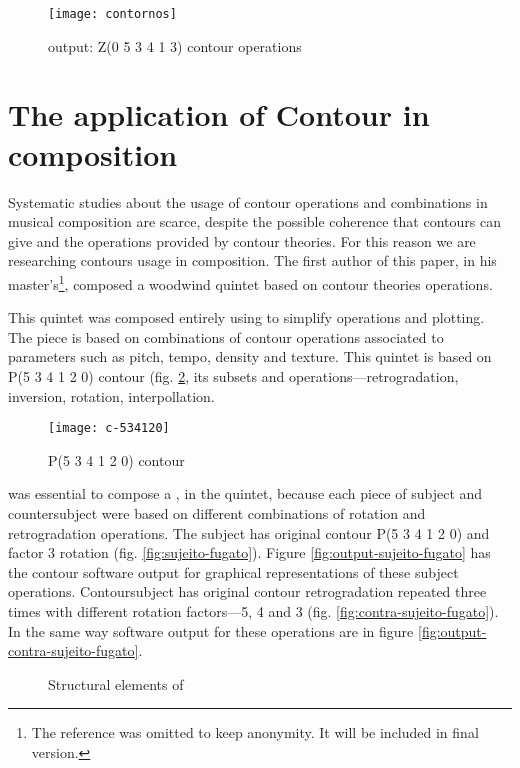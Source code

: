 \begin{figure}
  \centering
  \texttt{[image: contornos]}
  \caption{\goiaba{} output: Z(0 5 3 4 1 3) contour operations}
  \label{fig:operacoes}
\end{figure}

\section{The application of Contour in composition}
\label{sec:cont-appl-comp}

Systematic studies about the usage of contour operations and
combinations in musical composition are scarce, despite the possible
coherence that contours can give and the operations provided by
contour theories. For this reason we are researching contours usage in
composition. The first author of this paper, in his
master's\footnote{The reference was omitted to keep anonymity. It will
  be included in final version.}, composed a woodwind quintet based on
contour theories operations.

This quintet was composed entirely using \goiaba{} to simplify
operations and plotting. The piece is based on combinations of contour
operations associated to parameters such as pitch, tempo, density and
texture. This quintet is based on P(5 3 4 1 2 0) contour
(fig. \ref{fig:c-534120}, its subsets and operations---retrogradation,
inversion, rotation, interpollation.

\begin{figure}
  \centering
  \texttt{[image: c-534120]}
  \caption{P(5 3 4 1 2 0) contour}
  \label{fig:c-534120}
\end{figure}

\goiaba{} was essential to compose a , in the quintet,
because each piece of subject and countersubject were based on
different combinations of rotation and retrogradation operations.  The
subject has original contour P(5 3 4 1 2 0) and factor 3 rotation
(fig. \ref{fig:sujeito-fugato}). Figure
\ref{fig:output-sujeito-fugato} has the contour software output for
graphical representations of these subject operations. Contoursubject
has original contour retrogradation repeated three times with
different rotation factors---5, 4 and 3
(fig. \ref{fig:contra-sujeito-fugato}). In the same way software
output for these operations are in figure
\ref{fig:output-contra-sujeito-fugato}.

\begin{figure*}
  \centering

  \caption{Structural elements of }
  \label{fig:elementos-fugato}
\end{figure*}

